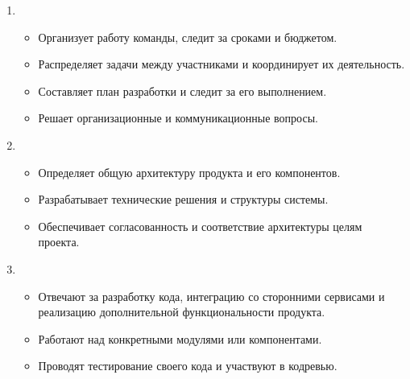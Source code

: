 \documentclass[letterpaper,10pt,russian]{sphinxmanual}
\begin{document}
\sphinxAtStartPar
{}
\begin{enumerate}
%
\item {} 
\sphinxAtStartPar
{}
\begin{itemize}
\item {} 
\sphinxAtStartPar
Организует работу команды, следит за сроками и бюджетом.

\item {} 
\sphinxAtStartPar
Распределяет задачи между участниками и координирует их деятельность.

\item {} 
\sphinxAtStartPar
Составляет план разработки и следит за его выполнением.

\item {} 
\sphinxAtStartPar
Решает организационные и коммуникационные вопросы.

\end{itemize}

\item {} 
\sphinxAtStartPar
{}
\begin{itemize}
\item {} 
\sphinxAtStartPar
Определяет общую архитектуру продукта и его компонентов.

\item {} 
\sphinxAtStartPar
Разрабатывает технические решения и структуры системы.

\item {} 
\sphinxAtStartPar
Обеспечивает согласованность и соответствие архитектуры целям проекта.

\end{itemize}

\item {} 
\sphinxAtStartPar
{}
\begin{itemize}
\item {} 
\sphinxAtStartPar
Отвечают за разработку кода, интеграцию со сторонними сервисами и реализацию дополнительной функциональности продукта.

\item {} 
\sphinxAtStartPar
Работают над конкретными модулями или компонентами.

\item {} 
\sphinxAtStartPar
Проводят тестирование своего кода и участвуют в код\sphinxhyphen{}ревью.


\end{itemize}
\end{enumerate}
\end{document}
